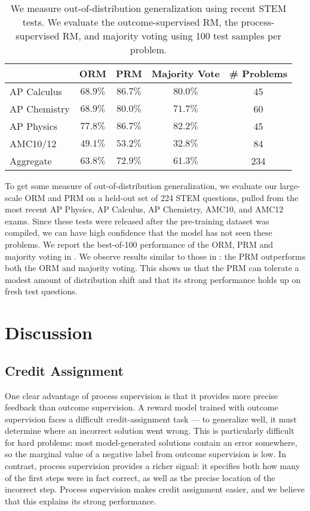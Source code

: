 \documentclass{article}
\begin{document}
\begin{table}
\centering
\begin{tabular}{l*{4}{c}} 
 \hline
  & ORM & PRM & Majority Vote & \# Problems \\ 
 \hline
 AP Calculus & $68.9\%$ & $\mathbf{86.7}\boldsymbol{\%}$ & $80.0\%$ & 45 \\ 
 AP Chemistry & $68.9\%$ & $\mathbf{80.0}\boldsymbol{\%}$ & $71.7\%$ & 60 \\
 AP Physics & $77.8\%$ & $\mathbf{86.7}\boldsymbol{\%}$ & $82.2\%$ & 45 \\
 AMC10/12 & $49.1\%$ & $\mathbf{53.2}\boldsymbol{\%}$ & $32.8\%$ & 84 \\
 Aggregate & $63.8\%$ & $\mathbf{72.9}\boldsymbol{\%}$ & $61.3\%$ & 234 \\
 \hline
\end{tabular}
\caption{We measure out-of-distribution generalization using recent STEM tests. We evaluate the outcome-supervised RM, the process-supervised RM, and majority voting using 100 test samples per problem.}
\label{table:generalization}
\end{table}

To get some measure of out-of-distribution generalization, we evaluate our large-scale ORM and PRM on a held-out set of 224 STEM questions, pulled from the most recent AP Physics, AP Calculus, AP Chemistry, AMC10, and AMC12 exams. Since these tests were released after the pre-training dataset was compiled, we can have high confidence that the model has not seen these problems. We report the best-of-100 performance of the ORM, PRM and majority voting in . We observe results similar to those in : the PRM outperforms both the ORM and majority voting. This shows us that the PRM can tolerate a modest amount of distribution shift and that its strong performance holds up on fresh test questions.

\section{Discussion} \label{section:discussion}

\subsection{Credit Assignment}

One clear advantage of process supervision is that it provides more precise feedback than outcome supervision. A reward model trained with outcome supervision faces a difficult credit-assignment task --- to generalize well, it must determine where an incorrect solution went wrong. This is particularly difficult for hard problems: most model-generated solutions contain an error somewhere, so the marginal value of a negative label from outcome supervision is low. In contrast, process supervision provides a richer signal: it specifies both how many of the first steps were in fact correct, as well as the precise location of the incorrect step. Process supervision makes credit assignment easier, and we believe that this explains its strong performance.
\end{document}
